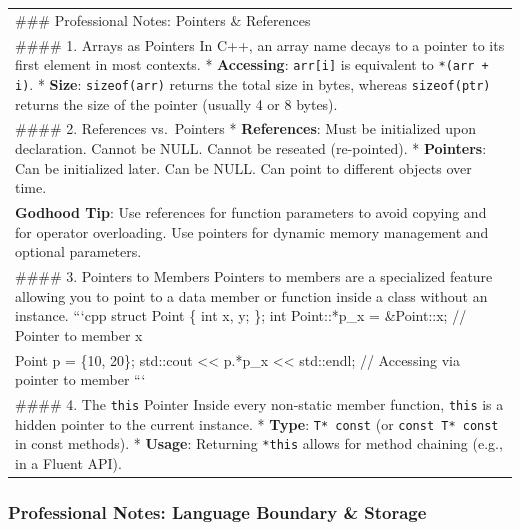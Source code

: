 \begin{longtable}[]{@{}
  >{\raggedright\arraybackslash}p{}@{}}
\toprule
\endhead
\#\#\# Professional Notes: Pointers \& References \\
\#\#\#\# 1. Arrays as Pointers In C++, an array name decays to a pointer
to its first element in most contexts. * \textbf{Accessing}:
\passthrough{\lstinline!arr[i]!} is equivalent to
\passthrough{\lstinline!*(arr + i)!}. * \textbf{Size}:
\passthrough{\lstinline!sizeof(arr)!} returns the total size in bytes,
whereas \passthrough{\lstinline!sizeof(ptr)!} returns the size of the
pointer (usually 4 or 8 bytes). \\
\#\#\#\# 2. References vs.~Pointers * \textbf{References}: Must be
initialized upon declaration. Cannot be NULL. Cannot be reseated
(re-pointed). * \textbf{Pointers}: Can be initialized later. Can be
NULL. Can point to different objects over time. \\
\textbf{Godhood Tip}: Use references for function parameters to avoid
copying and for operator overloading. Use pointers for dynamic memory
management and optional parameters. \\
\#\#\#\# 3. Pointers to Members Pointers to members are a specialized
feature allowing you to point to a data member or function inside a
class without an instance. ```cpp struct Point \{ int x, y; \}; int
Point::*p\_x = \&Point::x; // Pointer to member x \\
Point p = \{10, 20\}; std::cout \textless\textless{} p.*p\_x
\textless\textless{} std::endl; // Accessing via pointer to member
``` \\
\#\#\#\# 4. The \passthrough{\lstinline!this!} Pointer Inside every
non-static member function, \passthrough{\lstinline!this!} is a hidden
pointer to the current instance. * \textbf{Type}:
\passthrough{\lstinline!T* const!} (or
\passthrough{\lstinline!const T* const!} in const methods). *
\textbf{Usage}: Returning \passthrough{\lstinline!*this!} allows for
method chaining (e.g., in a Fluent API). \\
\bottomrule
\end{longtable}

\hypertarget{professional-notes-language-boundary-storage}{%
\subsubsection{Professional Notes: Language Boundary \&
Storage}\label{professional-notes-language-boundary-storage}}

